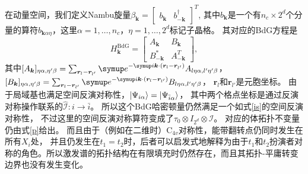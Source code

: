 在动量空间，我们定义Nambu旋量$\beta_{\bm{k}} =
\left[\begin{array}{cc}
  b_{\bm{k}} & b_{-\bm{k}}^{\dag}
\end{array}\right]^T$,
其中$b_{\bm{k}}$是一个有$n_c \times 2^d$个分量的算符$b_{\bm{k} \alpha \eta}$，这里$\alpha = 1, \ldots, n_c$，$\eta = 1, \ldots, 2^d$标记子晶格。
其对应的BdG方程是
\[ H^{\text{BdG}}_{\bm{k}} = \left[\begin{array}{cc}
     A_{\bm{k}} & B_{\bm{k}}\\
     B_{-\bm{k}}^{\ast} & A_{-\bm{k}}^T
   \end{array}\right], \]
   其中$[A_{\bm{k}}]_{\eta\alpha,\eta'\beta} = \sum_{\bm{r}_l -\bm{r}_{l'}} \eu^{-\iu \bm{k} \cdot (\bm{r}_l -\bm{r}_{l'})} A_{l \eta\alpha, l' \eta' \beta}$，
   $[B_{\bm{k}}]_{\eta\alpha,\eta'\beta} = \sum_{\bm{r}_l-\bm{r}_{l'}} \eu^{- \iu \bm{k} \cdot (\bm{r}_l-\bm{r}_{l'})} B_{l \eta \alpha, l' \eta' \beta}$，
   $\bm{r}_l$和$\bm{r}_{l'}$是元胞坐标。
   由于局域基也满足空间反演对称性，$\ket{\Psi_{i\alpha}}=\ket{\Psi_{\bar i\alpha}}$，
   其中两个格点坐标是通过反演对称操作联系的$\hat{\mathcal I}: i\rightarrow\bar i$。
   所以这个BdG哈密顿量仍然满足一个如式\eqref{is}的空间反演对称性，
   不过这里的空间反演对称算符变成了$\tau_0\otimes I_{2^d}\otimes \mathcal I$。
   对应的体拓扑不变量仍由式\eqref{p}给出。
   而且由于（例如在二维时）$\mathrm{C}_{4v}$对称性，能带翻转点仍同时发生在所有$X_i$处，
   并且仍发生在$t_1=t_2$时，后者可以启发式地解释为由于$t_1$和$t_2$扮演者对称的角色。所以激发谱的拓扑结构在有限填充时仍然存在，而且其拓扑-平庸转变边界也没有发生变化。
   
